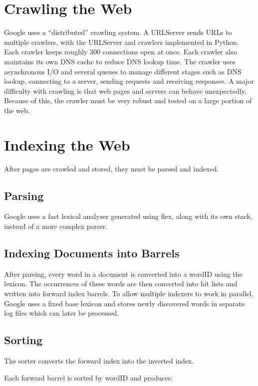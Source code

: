 \documentclass[10pt,a4paper]{article}
\begin{document}
\section{Crawling the Web}

Google uses a ``distributed'' crawling system. A URLServer sends URLs to multiple crawlers, with the URLServer and crawlers implemented in Python. Each crawler keeps roughly 300 connections open at once. Each crawler also maintains its own DNS cache to reduce DNS lookup time. The crawler uses asynchronous I/O and several queues to manage different stages such as DNS lookup, connecting to a server, sending requests and receiving responses. A major difficulty with crawling is that web pages and servers can behave unexpectedly. Because of this, the crawler must be very robust and tested on a large portion of the web.

\section{Indexing the Web}

After pages are crawled and stored, they must be parsed and indexed.

\subsection{Parsing}

Google uses a fast lexical analyzer generated using flex, along with its own stack, instead of a more complex parser.

\subsection{Indexing Documents into Barrels}

After parsing, every word in a document is converted into a wordID using the lexicon. The occurrences of these words are then converted into hit lists and written into forward index barrels. To allow multiple indexers to work in parallel, Google uses a fixed base lexicon and stores newly discovered words in separate log files which can later be processed.

\subsection{Sorting}

The sorter converts the forward index into the inverted index.

Each forward barrel is sorted by wordID and produces:
\end{document}
